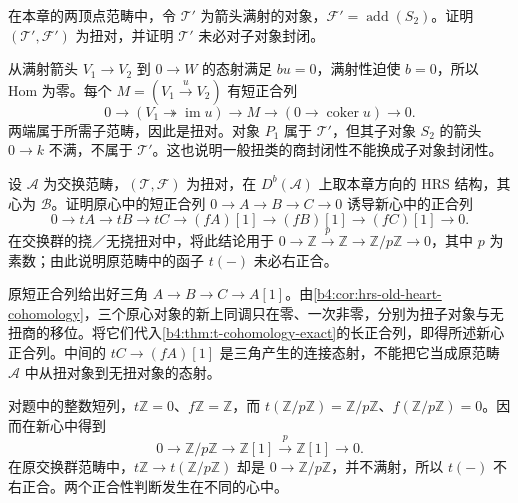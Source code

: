 \begin{exercise}\label{b4:ex:19-nonhereditary-torsion-class}
	在本章的两顶点范畴中，令 \(\mathcal T'\) 为箭头满射的对象，\(\mathcal F'=\operatorname{add}(S_2)\)。证明 \((\mathcal T',\mathcal F')\) 为扭对，并证明 \(\mathcal T'\) 未必对子对象封闭。
\end{exercise}
\begin{solution}
	从满射箭头 \(V_1\to V_2\) 到 \(0\to W\) 的态射满足 \(bu=0\)，满射性迫使 \(b=0\)，所以 Hom 为零。每个 \(M=(V_1\xrightarrow{u}V_2)\) 有短正合列
	\[
		0\longrightarrow(V_1\twoheadrightarrow\operatorname{im}u) \longrightarrow M\longrightarrow(0\to\operatorname{coker}u)\longrightarrow0.
	\]
	两端属于所需子范畴，因此是扭对。对象 \(P_1\) 属于 \(\mathcal T'\)，但其子对象 \(S_2\) 的箭头 \(0\to k\) 不满，不属于 \(\mathcal T'\)。这也说明一般扭类的商封闭性不能换成子对象封闭性。
\end{solution}

\begin{exercise}\label{b4:ex:19-old-object-new-cohomology}
	设 \(\mathcal A\) 为交换范畴，\((\mathcal T,\mathcal F)\) 为扭对，在 \(D^b(\mathcal A)\) 上取本章方向的 HRS 结构，其心为 \(\mathcal B\)。证明原心中的短正合列 \(0\to A\to B\to C\to0\) 诱导新心中的正合列
	\[
		0\longrightarrow tA\longrightarrow tB\longrightarrow tC \longrightarrow(fA)[1]\longrightarrow(fB)[1]\longrightarrow(fC)[1] \longrightarrow0.
	\]
	在交换群的挠／无挠扭对中，将此结论用于 \(0\to\mathbb Z\xrightarrow{p}\mathbb Z\to\mathbb Z/p\mathbb Z\to0\)，其中 \(p\) 为素数；由此说明原范畴中的函子 \(t(-)\) 未必右正合。
\end{exercise}
\begin{solution}
	原短正合列给出好三角 \(A\to B\to C\to A[1]\)。由\cref{b4:cor:hrs-old-heart-cohomology}，三个原心对象的新上同调只在零、一次非零，分别为扭子对象与无扭商的移位。将它们代入\cref{b4:thm:t-cohomology-exact}的长正合列，即得所述新心正合列。中间的 \(tC\to(fA)[1]\) 是三角产生的连接态射，不能把它当成原范畴 \(\mathcal A\) 中从扭对象到无扭对象的态射。

	对题中的整数短列，\(t\mathbb Z=0\)、\(f\mathbb Z=\mathbb Z\)，而 \(t(\mathbb Z/p\mathbb Z)=\mathbb Z/p\mathbb Z\)、\(f(\mathbb Z/p\mathbb Z)=0\)。因而在新心中得到
	\[
		0\longrightarrow\mathbb Z/p\mathbb Z\longrightarrow\mathbb Z[1] \xrightarrow{p}\mathbb Z[1]\longrightarrow0.
	\]
	在原交换群范畴中，\(t\mathbb Z\to t(\mathbb Z/p\mathbb Z)\) 却是 \(0\to\mathbb Z/p\mathbb Z\)，并不满射，所以 \(t(-)\) 不右正合。两个正合性判断发生在不同的心中。
\end{solution}

